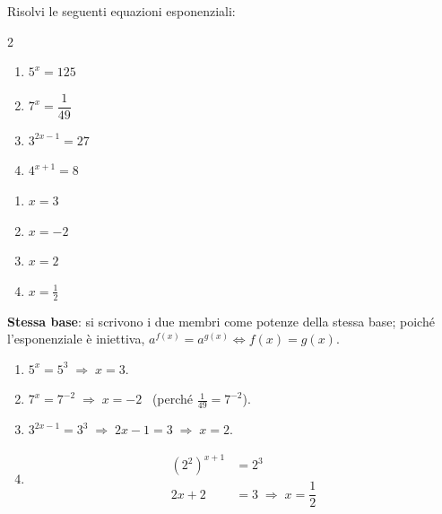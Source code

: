\begin{question}[ID=3.2, subtitle={Equazioni esponenziali con la stessa base}, difficulty=facile, tags={equazioni, esponenziali}]
Risolvi le seguenti equazioni esponenziali:
\begin{center}\begin{minipage}{0.92\linewidth}
\begin{multicols}{2}
\begin{enumerate}[leftmargin=3.2cm]
\item $5^{x} = 125$
\item $7^{x} = \dfrac{1}{49}$
\item $3^{2x-1} = 27$
\item $4^{x+1} = 8$
\end{enumerate}
\end{multicols}
\end{minipage}\end{center}
\begin{solution}
\begin{enumerate}
    \item $x=3$
    \item $x=-2$
    \item $x=2$
    \item $x=\tfrac12$
\end{enumerate}
\end{solution}
\begin{explanation}
\textbf{Stessa base}: si scrivono i due membri come potenze della stessa base; poiché l'esponenziale è iniettiva, $a^{f(x)}=a^{g(x)} \iff f(x)=g(x)$.
\begin{enumerate}
    \item $5^x=5^3 \;\Rightarrow\; x=3$.
    \item $7^x=7^{-2} \;\Rightarrow\; x=-2$ \ (perché $\tfrac1{49}=7^{-2}$).
    \item $3^{2x-1}=3^3 \;\Rightarrow\; 2x-1=3 \;\Rightarrow\; x=2$.
    \item \[\begin{aligned}
    (2^2)^{x+1} &= 2^3\\
    2x+2 &= 3 \;\Rightarrow\; x=\dfrac12
    \end{aligned}\]
\end{enumerate}
\end{explanation}
\end{question}


